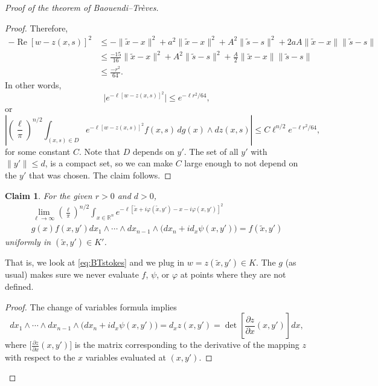 \documentclass[12pt,openany]{book}
\renewcommand{\Re}{\operatorname{Re}}
\newcommand{\snorm}[1]{\lVert {#1} \rVert}
\newcommand{\babs}[1]{\bigl\lvert {#1} \bigr\rvert}
\newcommand{\abs}[1]{\left\lvert {#1} \right\rvert}
\newcommand{\R}{{\mathbb{R}}}
\theoremstyle{plain}
\newtheorem{claim}[thm]{Claim}
\theoremstyle{remark}
\theoremstyle{definition}
\theoremstyle{exercise}
\theoremstyle{example}
\begin{document}
\begin{proof}[Proof of the theorem of Baouendi--Tr{\`e}ves]
\begin{proof}
Therefore,
\begin{equation*}
\begin{split}
-\Re {[w - z(x,s)]}^2 & \leq
- \snorm{\tilde{x}-x}^2
+
a^2 \snorm{\tilde{x}-x}^2
+
A^2 \snorm{\tilde{s}-s}^2
+
2aA \snorm{\tilde{x}-x}\snorm{\tilde{s}-s}
\\
& \leq
\frac{-15}{16} \snorm{\tilde{x}-x}^2
+
A^2 \snorm{\tilde{s}-s}^2
+
\frac{A}{2} \snorm{\tilde{x}-x}\snorm{\tilde{s}-s}
\\
& \leq \frac{-r^2}{64} .
\end{split}
\end{equation*}
In other words,
\begin{equation*}
\babs{
e^{-\ell[w-z(x,s)]^2}}
\leq
e^{-\ell r^2  / 64} ,
\end{equation*}
or
\begin{equation*}
\abs{
{\left(\frac{\ell}{\pi}\right)}^{n/2}
\int_{(x,s)\in D}
e^{-\ell [w - z(x,s)]^2} f(x,s)
\,
dg(x) 
\wedge
dz(x,s)
}
\leq
C
\ell^{n/2}
e^{-\ell r^2  / 64} ,
\end{equation*}
for some constant $C$.  Note that $D$ depends on $y'$.  The set of
all $y'$ with $\snorm{y'} \leq d$,
is a compact set, so we can make $C$
large enough to not depend on the $y'$ that was chosen.
The claim follows.
\end{proof}

\begin{claim}
For the given $r>0$ and $d>0$,
\begin{multline*}
\lim_{\ell\to\infty}
{\left(\frac{\ell}{\pi}\right)}^{n/2}
\int_{x \in \R^n}
e^{  -\ell [\tilde{x}+i\varphi(\tilde{x},y') - x-i\varphi(x,y')]^2 }
\\
g(x) f(x,y')
dx_1  \wedge
\cdots \wedge
dx_{n-1}
\wedge
\bigl(dx_{n} + i d_x \psi (x,y') \bigr) 
= f(\tilde{x},y')
\end{multline*}
uniformly in $(\tilde{x},y') \in K'$.
\end{claim}

That is, we look at \eqref{eq:BTstokes} and we plug in $w = z(\tilde{x},y') \in K$.
The $g$ (as usual) makes sure we never evaluate $f$, $\psi$, or
$\varphi$ at
points where they are not defined.

\begin{proof}
The change of variables formula implies
\begin{equation*}
dx_1  \wedge
\cdots \wedge
dx_{n-1}
\wedge
\bigl(dx_{n} + i d_x \psi (x,y') \bigr) 
=
d_x z(x,y')
=
\det \left[\frac{\partial z}{\partial x}(x,y')\right] dx ,
\end{equation*}
where $\bigl[\frac{\partial z}{\partial x}(x,y')\bigr]$ is the matrix
corresponding to the derivative of the mapping $z$ with respect to the $x$
variables evaluated at $(x,y')$.


\end{proof}
\end{proof}
\end{document}
